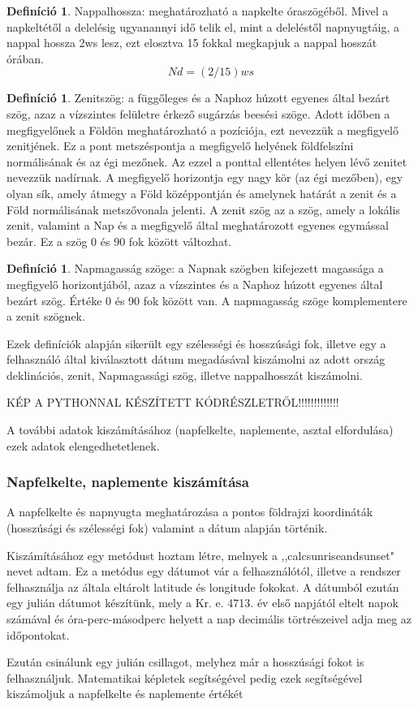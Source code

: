 \documentclass[
]{thesis-ekf}
\theoremstyle{definition}
\newtheorem{definicio}[tetel]{Definíció}
\theoremstyle{remark}
\begin{document}
			\begin{definicio}
				Nappalhossza: meghatározható a napkelte óraszögéből. Mivel a napkeltétől a delelésig ugyanannyi idő telik el, mint a deleléstől napnyugtáig, a nappal hossza 2ws lesz, ezt elosztva 15 fokkal megkapjuk a nappal hosszát órában.
				\[Nd = (2/15) ws\]
				\cite{Kornyezet}
			\end{definicio}
			\begin{definicio}
				Zenitszög: a függőleges és a Naphoz húzott egyenes által bezárt szög, azaz a vízszintes felületre érkező sugárzás beesési szöge. Adott időben a megfigyelőnek a Földön meghatározható a pozíciója, ezt nevezzük a megfigyelő zenitjének. Ez a pont metszéspontja a megfigyelő helyének földfelszíni normálisának és az égi mezőnek. Az ezzel a ponttal ellentétes helyen lévő zenitet nevezzük nadírnak. A megfigyelő horizontja egy nagy kör (az égi mezőben), egy olyan sík, amely átmegy a Föld középpontján és amelynek határát a zenit és a Föld normálisának metszővonala jelenti. A zenit szög az a szög, amely a lokális zenit, valamint a Nap és a megfigyelő által meghatározott egyenes egymással bezár. Ez a szög 0 és 90 fok között változhat.
				\cite{Kornyezet}
			\end{definicio}
			\begin{definicio}
				Napmagasság szöge: a Napnak szögben kifejezett magassága a megfigyelő horizontjából, azaz a vízszintes és a Naphoz húzott egyenes által bezárt szög. Értéke 0 és 90 fok között van. A napmagasság szöge komplementere a zenit szögnek.
				\cite{Kornyezet}
			\end{definicio}
			\par Ezek definíciók alapján sikerült egy szélességi és hosszúsági fok, illetve egy a felhasználó által kiválasztott dátum megadásával kiszámolni az adott ország deklinációs, zenit, Napmagassági szög, illetve nappalhosszát kiszámolni.
			\par KÉP A PYTHONNAL KÉSZÍTETT KÓDRÉSZLETRŐL!!!!!!!!!!!!!
			\par A további adatok kiszámításához (napfelkelte, naplemente, asztal elfordulása) ezek adatok elengedhetetlenek.
			\subsubsection{Napfelkelte, naplemente kiszámítása}
				\par A napfelkelte és napnyugta meghatározása a pontos földrajzi koordináták (hosszúsági és szélességi fok) valamint a dátum alapján történik.\cite{kiszamolo}
				\par Kiszámításához egy metódust hoztam létre, melnyek a  ,,calcsunriseandsunset" nevet adtam. Ez a metódus egy dátumot vár a felhasználótól, illetve a rendszer felhasználja az általa eltárolt latitude és longitude fokokat. A dátumból ezután egy julián dátumot készítünk, mely a Kr. e. 4713. év első napjától eltelt napok számával és óra-perc-másodperc helyett a nap decimális törtrészeivel adja meg az időpontokat.\cite{julian}
				\par Ezután csinálunk egy julián csillagot, melyhez már a hosszúsági fokot is felhasználjuk. Matematikai képletek segítségével pedig ezek segítségével kiszámoljuk a napfelkelte és naplemente értékét
				
\end{document}
